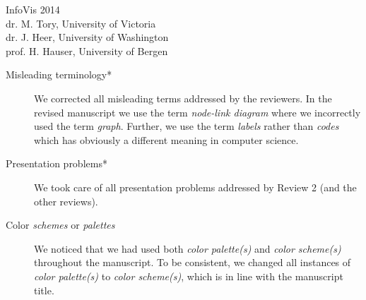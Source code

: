 \documentclass{letter}
\begin{document}
\begin{letter}{InfoVis 2014 \\ dr. M. Tory, University of Victoria \\ dr. J. Heer, University of Washington \\ prof. H. Hauser, University of Bergen}
\begin{description}
\item[Misleading terminology*] We corrected all misleading terms addressed by the reviewers. In the revised manuscript we use the term \textit{node-link diagram} where we incorrectly used the term \textit{graph}. Further, we use the term \textit{labels} rather than \textit{codes} which has obviously a different meaning in computer science.
\item[Presentation problems*] We took care of all presentation problems addressed by Review 2 (and the other reviews).
\item[Color \textit{schemes} or \textit{palettes}] We noticed that we had used both \textit{color palette(s)} and \textit{color scheme(s)} throughout the manuscript. To be consistent, we changed all instances of \textit{color palette(s)} to \textit{color scheme(s)}, which is in line with the manuscript title.
\end{description}
  
\bigskip
   


\end{letter}
\end{document}

